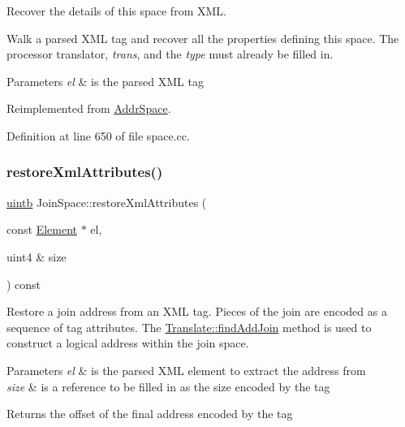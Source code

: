 Recover the details of this space from X\+ML. 

Walk a parsed X\+ML tag and recover all the properties defining this space. The processor translator, {\itshape trans}, and the {\itshape type} must already be filled in. 
\begin{DoxyParams}{Parameters}
{\em el} & is the parsed X\+ML tag \\
\hline
\end{DoxyParams}


Reimplemented from \mbox{\hyperlink{class_addr_space_aa2fe50d288eef7ea713cce99774c4eca}{Addr\+Space}}.



Definition at line 650 of file space.\+cc.

\mbox{\label{class_join_space_aca1360dbe0abf4a9ace679887cb47c17}} 
\subsubsection{\texorpdfstring{restoreXmlAttributes()}{restoreXmlAttributes()}}
{\footnotesize\ttfamily \mbox{\hyperlink{types_8h_a2db313c5d32a12b01d26ac9b3bca178f}{uintb}} Join\+Space\+::restore\+Xml\+Attributes (\begin{DoxyParamCaption}\item[{const \mbox{\hyperlink{class_element}{Element}} $\ast$}]{el,  }\item[{uint4 \&}]{size }\end{DoxyParamCaption}) const\hspace{0.3cm}{\ttfamily [virtual]}}

Restore a join address from an X\+ML tag. Pieces of the join are encoded as a sequence of tag attributes. The \mbox{\hyperlink{class_addr_space_manager_a1b9e7e934e22b6bea3b2b949fd2b2159}{Translate\+::find\+Add\+Join}} method is used to construct a logical address within the join space. 
\begin{DoxyParams}{Parameters}
{\em el} & is the parsed X\+ML element to extract the address from \\
\hline
{\em size} & is a reference to be filled in as the size encoded by the tag \\
\hline
\end{DoxyParams}
\begin{DoxyReturn}{Returns}
the offset of the final address encoded by the tag 
\end{DoxyReturn}


